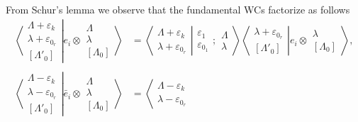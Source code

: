 \documentclass[12pt]{article}
\def\nn{\nonumber}
\begin{document}
From Schur's lemma we observe that the fundamental WCs factorize as follows
\begin{align}
\left\langle\left. 
\begin{array}{c} \Lambda+\varepsilon_k\\ \lambda+\varepsilon_{0_r} \\ {[\Lambda'_0]} \end{array}
\right|\right.
\left.
e_i\otimes \begin{array}{c} \Lambda \\ \lambda \\
{[\Lambda_0]} \end{array}
\right\rangle &= 
\left\langle\left. 
\begin{array}{c} \Lambda+\varepsilon_k\\ \lambda+\varepsilon_{0_r} 
 \end{array}
\right|\right.
\left.
\begin{array}{c} \varepsilon_1 \\ \varepsilon_{0_1} 
 \end{array}
; \begin{array}{c} \Lambda \\ \lambda
 \end{array}
\right\rangle 
\left\langle\left. 
\begin{array}{c} \lambda+\varepsilon_{0_r} \\ {[\Lambda'_0]} \end{array}
\right|\right.
\left.
e_i\otimes \begin{array}{c} \lambda \\
{[\Lambda_0]} \end{array}
\right\rangle,\label{Schur1}\\ 
~~~ \nn\\
\left\langle\left. 
\begin{array}{c} \Lambda-\varepsilon_k\\ \lambda-\varepsilon_{0_r} \\ {[\Lambda'_0]} \end{array}
\right|\right.
\left.
\bar{e}_i\otimes \begin{array}{c} \Lambda \\ \lambda \\
{[\Lambda_0]} \end{array}
\right\rangle &= 
\left\langle\left. 
\begin{array}{c} \Lambda-\varepsilon_k\\ \lambda-\varepsilon_{0_r} 
 \end{array}

\end{align}
\end{document}
